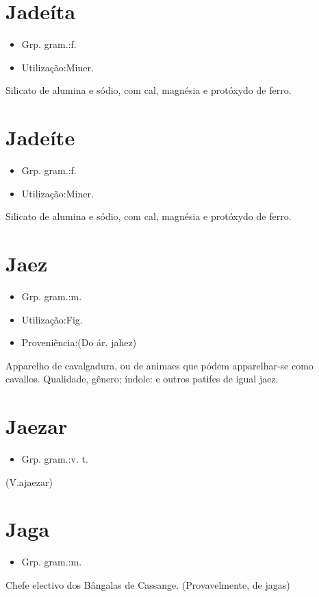 \documentclass{article}
\begin{document}
\section{Jadeíta}
\begin{itemize}
\item {Grp. gram.:f.}
\end{itemize}
\begin{itemize}
\item {Utilização:Miner.}
\end{itemize}
Silicato de alumina e sódio, com cal, magnésia e protóxydo de ferro.
\section{Jadeíte}
\begin{itemize}
\item {Grp. gram.:f.}
\end{itemize}
\begin{itemize}
\item {Utilização:Miner.}
\end{itemize}
Silicato de alumina e sódio, com cal, magnésia e protóxydo de ferro.
\section{Jaez}
\begin{itemize}
\item {Grp. gram.:m.}
\end{itemize}
\begin{itemize}
\item {Utilização:Fig.}
\end{itemize}
\begin{itemize}
\item {Proveniência:(Do ár. \textunderscore jahez\textunderscore )}
\end{itemize}
Apparelho de cavalgadura, ou de animaes que pódem apparelhar-se como cavallos.
Qualidade, gênero; índole: \textunderscore e outros patifes de igual jaez\textunderscore .
\section{Jaezar}
\begin{itemize}
\item {Grp. gram.:v. t.}
\end{itemize}
(V.ajaezar)
\section{Jaga}
\begin{itemize}
\item {Grp. gram.:m.}
\end{itemize}
Chefe electivo dos Bângalas de Cassange.
(Provavelmente, de \textunderscore jagas\textunderscore )
\end{document}

